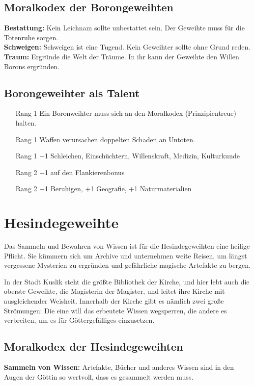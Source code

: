 \documentclass[../../Heldenanleitung2]{subfiles}
\begin{document}
\subsection{Moralkodex der Borongeweihten}
\textbf{Bestattung:} Kein Leichnam sollte unbestattet sein. Der
Geweihte muss für die Totenruhe sorgen.\\

\noindent
\textbf{Schweigen:} Schweigen ist eine Tugend. Kein Geweihter
sollte ohne Grund reden.\\

\noindent
\textbf{Traum:} Ergründe die Welt der Träume. In ihr kann der
Geweihte den Willen Borons ergründen.

\subsection{Borongeweihter als Talent}
\begin{itemize}
	\item[Rang 1] Ein Boronweihter muss sich an den Moralkodex
(Prinzipientreue) halten.
	\item[Rang 1] Waffen verursachen doppelten Schaden an Untoten.
	\item[Rang 1] +1 Schleichen, Einschüchtern, Willenskraft, Medizin, Kulturkunde
	\item[Rang 2] +1 auf den Flankierenbonus
	\item[Rang 2] +1 Beruhigen, +1 Geografie, +1 Naturmaterialien
\end{itemize}

\section{Hesindegeweihte}
Das Sammeln und Bewahren
von Wissen ist für die
Hesindegeweihten eine
heilige Pflicht. Sie kümmern sich um Archive und
unternehmen weite Reisen,
um längst vergessene Mysterien
zu ergründen und gefährliche magische Artefakte zu
bergen.

In der Stadt Kuslik steht die größte Bibliothek der
Kirche, und hier lebt auch die oberste Geweihte, die
Magisterin der Magister, und leitet ihre Kirche mit
ausgleichender Weisheit. Innerhalb der Kirche gibt
es nämlich zwei große Strömungen: Die eine will das
erbeutete Wissen wegsperren, die andere es verbreiten,
um es für Göttergefälliges einzusetzen.

\subsection{Moralkodex der Hesindegeweihten}
\textbf{Sammeln von Wissen:} Artefakte, Bücher und anderes
Wissen sind in den Augen der Göttin so wertvoll, dass
es gesammelt werden muss.\\
\end{document}
